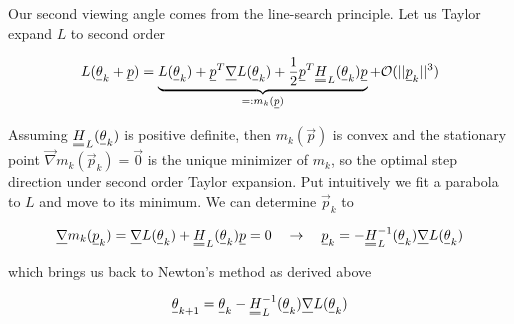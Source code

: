 Our second viewing angle comes from the line-search principle. Let us Taylor expand
$L$ to second order

\begin{equation}
    L(\vec{\theta}_k + \vec{p}) = \underbrace{L(\vec{\theta}_k) + \vec{p}^T \vec{\nabla} L(\vec{\theta}_k) + \frac{1}{2} \vec{p}^T \mat{H}_L(\vec{\theta}_k) \vec{p}}_{=: m_k(\vec{p})} + \mathcal{O}(||\vec{p}_k||^3)
\end{equation}

Assuming $\mat{H}_L(\vec{\theta}_k)$ is positive definite, then $m_k(\vec{p})$ is convex and
the stationary point $\vec{\nabla} m_k(\vec{p}_k) = \vec{0}$ is the unique minimizer of
$m_k$, so the optimal step direction under second order Taylor expansion. Put intuitively
we fit a parabola to $L$ and move to its minimum. We can 
determine $\vec{p}_k$ to

\begin{equation}
    \vec{\nabla} m_k(\vec{p}_k) = \vec{\nabla} L(\vec{\theta}_k) + \mat{H}_L(\vec{\theta}_k) \vec{p} = 0 \quad \rightarrow \quad \vec{p}_k = -\mat{H}_L^{-1}(\vec{\theta}_k) \vec{\nabla} L(\vec{\theta}_k)
\end{equation}

which brings us back to Newton's method as derived above

\begin{equation}
    \vec{\theta}_{k+1} = \vec{\theta}_k - \mat{H}_L^{-1}(\vec{\theta}_k) \vec{\nabla}L(\vec{\theta}_k)
\end{equation}



